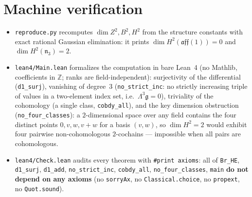 \documentclass[11pt]{article}
\begin{document}
\section{Machine verification}

\begin{itemize}
\item \texttt{reproduce.py} recomputes $\dim Z^2,B^2,H^2$ from the structure constants with exact rational Gaussian elimination: it prints $\dim H^2(\mathfrak{aff}(1))=0$ and $\dim H^2(\mathfrak{n}_3)=2$.
\item \texttt{lean4/Main.lean} formalizes the computation in bare Lean~4 (no Mathlib, coefficients in $\mathbb{Z}$; ranks are field-independent): surjectivity of the differential (\texttt{d1\_surj}), vanishing of degree~3 (\texttt{no\_strict\_inc}: no strictly increasing triple of values in a two-element index set, i.e.\ $\Lambda^3\mathfrak{g}=0$), triviality of the cohomology (a single class, \texttt{cobdy\_all}), and the key dimension obstruction (\texttt{no\_four\_classes}): a $2$-dimensional space over any field contains the four distinct points $0,v,w,v+w$ for a basis $(v,w)$, so $\dim H^2=2$ would exhibit four pairwise non-cohomologous $2$-cochains --- impossible when all pairs are cohomologous.
\item \texttt{lean4/Check.lean} audits every theorem with \texttt{\#print axioms}: all of \texttt{Br\_HE}, \texttt{d1\_surj}, \texttt{d1\_add}, \texttt{no\_strict\_inc}, \texttt{cobdy\_all}, \texttt{no\_four\_classes}, \texttt{main} \textbf{do not depend on any axioms} (no \texttt{sorryAx}, no \texttt{Classical.choice}, no \texttt{propext}, no \texttt{Quot.sound}).
\end{itemize}
\end{document}
